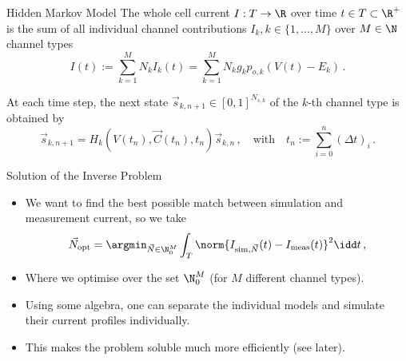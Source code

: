 \documentclass[aspectratio=169, hyperref={colorlinks=true}]{beamer}
\begin{document}
  \begin{frame}{Hidden Markov Model}
    The whole cell current $I: T \to \R$ over time $t \in T \subset \R^+$ is the sum of all individual channel contributions $I_k, k \in \{1, ..., M\}$ over $M \in \N$ channel types
    \begin{equation*}
      I(t) := \sum_{k=1}^{M} N_k I_k(t) = \sum_{k=1}^{M} N_k g_k p_{o,k} \left(V(t)-E_k\right)\,.
      \label{eq:current}
    \end{equation*}

    At each time step, the next state $\vec{s}_{k,n+1} \in [0, 1]^{N_{s,k}}$ of the $k$-th channel type is obtained by
    \begin{equation*}
      \vec{s}_{k,n+1} = H_{k}\left(V(t_n), \vec{C}(t_n), t_n\right) \vec{s}_{k,n}\,,
      \quad\text{with}\quad
      t_n := \sum_{i=0}^n (\Delta t)_i\,.
    \end{equation*}
  \end{frame}

  \begin{frame}{Solution of the Inverse Problem}
    \begin{itemize}
      \item We want to find the best possible match between simulation and measurement current, so we take
            $$\vec{N}_{\rm opt} = \argmin_{\vec{N} \in \N_0^M} \int_T \norm{I_{{\rm sim}, \vec{N}}(t) - I_{\rm meas}(t)}^2 \idd t\,,$$
      \item Where we optimise over the set $\N_0^M$ (for $M$ different channel types).
      \item Using some algebra, one can separate the individual models and simulate their current profiles individually.
      \item This makes the problem soluble much more efficiently (see later).
    \end{itemize}
  \end{frame}
\end{document}
